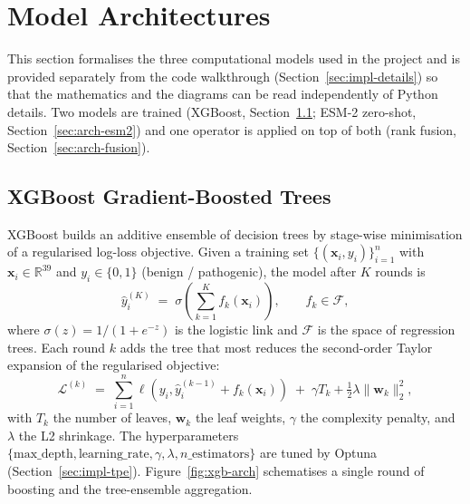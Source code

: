 \documentclass[11pt,a4paper,oneside]{report}
\begin{document}
\section{Model Architectures}
\label{sec:impl-models}

This section formalises the three computational models used
in the project and is provided separately from the code
walkthrough (Section~\ref{sec:impl-details}) so that the
mathematics and the diagrams can be read independently of
Python details. Two models are trained (XGBoost,
Section~\ref{sec:arch-xgb}; ESM-2 zero-shot,
Section~\ref{sec:arch-esm2}) and one operator is applied
on top of both (rank fusion, Section~\ref{sec:arch-fusion}).

\subsection{XGBoost Gradient-Boosted Trees}
\label{sec:arch-xgb}

XGBoost \citep{chen2016xgboost} builds an additive ensemble
of decision trees by stage-wise minimisation of a
regularised log-loss objective. Given a training set
$\{(\mathbf{x}_i, y_i)\}_{i=1}^{n}$ with
$\mathbf{x}_i \in \mathbb{R}^{39}$ and $y_i \in \{0, 1\}$
(benign / pathogenic), the model after $K$ rounds is
\begin{equation}
  \hat{y}_i^{(K)} \;=\; \sigma\!\left(\sum_{k=1}^{K} f_k(\mathbf{x}_i)\right), \qquad
  f_k \in \mathcal{F},
  \label{eq:xgb-additive}
\end{equation}
where $\sigma(z) = 1/(1 + e^{-z})$ is the logistic link and
$\mathcal{F}$ is the space of regression trees. Each round
$k$ adds the tree that most reduces the second-order Taylor
expansion of the regularised objective:
\begin{equation}
  \mathcal{L}^{(k)} \;=\;
  \sum_{i=1}^{n} \ell(y_i, \hat{y}_i^{(k-1)} + f_k(\mathbf{x}_i))
  \;+\;
  \gamma T_k + \tfrac{1}{2}\lambda\|\mathbf{w}_k\|_2^2,
  \label{eq:xgb-objective}
\end{equation}
with $T_k$ the number of leaves, $\mathbf{w}_k$ the leaf
weights, $\gamma$ the complexity penalty, and $\lambda$ the
L2 shrinkage. The hyperparameters
$\{\text{max\_depth}, \text{learning\_rate}, \gamma, \lambda, n\_\text{estimators}\}$
are tuned by Optuna (Section~\ref{sec:impl-tpe}).
Figure~\ref{fig:xgb-arch} schematises a single round of
boosting and the tree-ensemble aggregation.
\end{document}
